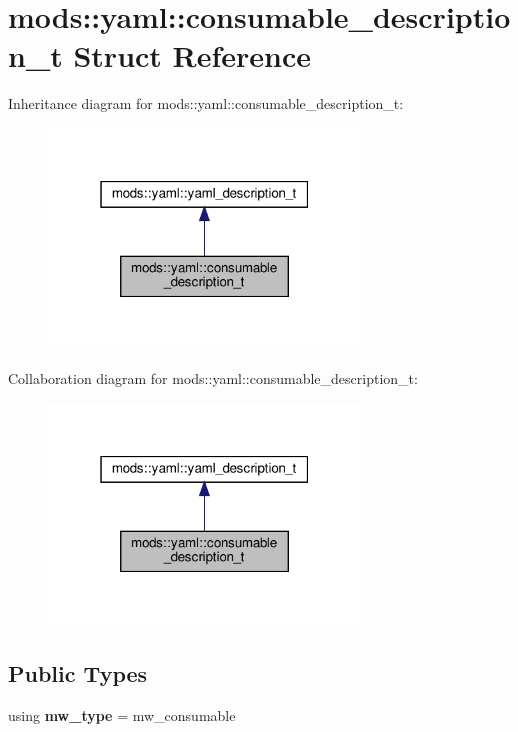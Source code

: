 \hypertarget{structmods_1_1yaml_1_1consumable__description__t}{}\section{mods\+:\+:yaml\+:\+:consumable\+\_\+description\+\_\+t Struct Reference}
\label{structmods_1_1yaml_1_1consumable__description__t}


Inheritance diagram for mods\+:\+:yaml\+:\+:consumable\+\_\+description\+\_\+t\+:\nopagebreak
\begin{figure}[H]
\begin{center}
\leavevmode
\includegraphics[width=235pt]{structmods_1_1yaml_1_1consumable__description__t__inherit__graph}
\end{center}
\end{figure}


Collaboration diagram for mods\+:\+:yaml\+:\+:consumable\+\_\+description\+\_\+t\+:\nopagebreak
\begin{figure}[H]
\begin{center}
\leavevmode
\includegraphics[width=235pt]{structmods_1_1yaml_1_1consumable__description__t__coll__graph}
\end{center}
\end{figure}
\subsection*{Public Types}
\begin{DoxyCompactItemize}
\item 
\mbox{\label{structmods_1_1yaml_1_1consumable__description__t_a14ec6b3d896a1f21e016d934679b2ebc}} 
using {\bfseries mw\+\_\+type} = mw\+\_\+consumable
\end{DoxyCompactItemize}
